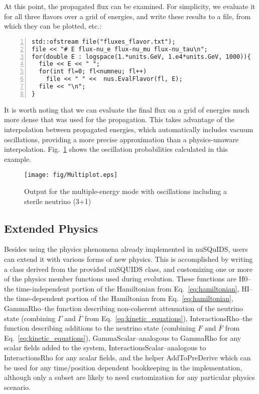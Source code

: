 \documentclass[3p,12pt]{elsarticle}
\newcommand{\ttf}{\ttfamily}
\begin{document}
At this point, the propagated flux can be examined. 
For simplicity, we evaluate it for all three flavors over a grid of energies, and write these results to a file, from which they can be plotted, etc.:
\begin{lstlisting}[frame=leftline, numbers=left, breaklines=true, firstnumber=last]
std::ofstream file("fluxes_flavor.txt");
file << "# E flux-nu_e flux-nu_mu flux-nu_tau\n";
for(double E : logspace(1.*units.GeV, 1.e4*units.GeV, 1000)){
  file << E << " ";
  for(int fl=0; fl<numneu; fl++)
    file << " " <<  nus.EvalFlavor(fl, E);
  file << "\n";
}
\end{lstlisting}
It is worth noting that we can evaluate the final flux on a grid of energies much more dense that was used for the propagation. 
This takes advantage of the interpolation between propagated energies, which automatically includes vacuum oscillations, providing a more precise approximation than a physics-unaware interpolation. 
Fig.~\ref{fig:short_multimode} shows the oscillation probabilities calculated in this example.

\begin{figure}[h]
  \label{fig:short_multimode}
  \centering
  \texttt{[image: fig/Multiplot.eps]} 
  \caption{Output for the multiple-energy mode with oscillations including a sterile neutrino (3+1)} 
\end{figure}

\subsection{Extended Physics}
\label{ssec:extphys}

Besides using the physics phenomena already implemented in {\ttf nuSQuIDS}, users can extend it with various forms of new physics. 
This is accomplished by writing a class derived from the provided {\ttf nuSQUIDS} class, and customizing one or more of the physics member functions used during evolution. 
These functions are {\ttf H0}--the time-independent portion of the Hamiltonian from Eq.~\ref{eq:hamiltonian}, {\ttf HI}--the time-dependent portion of the Hamiltonian from Eq.~\ref{eq:hamiltonian}, {\ttf GammaRho}--the function describing non-coherent attenuation of the neutrino state (combining $\Gamma$ and $\bar\Gamma$ from Eq.~\ref{eq:kinetic_equations}), {\ttf InteractionsRho}--the function describing additions to the neutrino state (combining $F$ and $\bar F$ from Eq.~\ref{eq:kinetic_equations}), {\ttf GammaScalar}--analogous to {\ttf GammaRho} for any scalar fields added to the system, {\ttf InteractionsScalar}--analogous to {\ttf InteractionsRho} for any scalar fields, and the helper {\ttf AddToPreDerive} which can be used for any time/position dependent bookkeeping in the implementation, although only a subset are likely to need customization for any particular physics scenario. 
\end{document}
